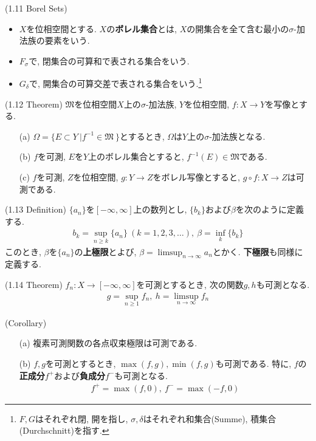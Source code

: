 \documentclass[a4paper]{jsarticle}
\begin{document}
\begin{defi}{(1.11 Borel Sets)}{}
    \begin{itemize}
        \item $X$を位相空間とする. $X$の{\bf ボレル集合}とは, $X$の開集合を全て含む最小の$\sigma$-加法族の要素をいう.
        \item $F_\sigma$で, 閉集合の可算和で表される集合をいう.
        \item $G_\delta$で, 開集合の可算交差で表される集合をいう.\footnote{$F, G$はそれぞれ閉, 開を指し, $\sigma, \delta$はそれぞれ和集合(Summe), 積集合(Durchschnitt)を指す.}
    \end{itemize}
\end{defi}

\begin{thm}{(1.12 Theorem)}{}
    $\mathfrak{M}$を位相空間$X$上の$\sigma$-加法族, $Y$を位相空間, $f:X\to Y$を写像とする.
    \begin{enumerate}
        \item[(a)] $\Omega = \{E\subset Y\ | f^{-1}\in \mathfrak{M} \  \}$とするとき, $\Omega$は$Y$上の$\sigma$-加法族となる.
        \item[(b)] $f$を可測, $E$を$Y$上のボレル集合とすると, $f^{-1}(E)\in \mathfrak{M}$である.
        \item[(c)] $f$を可測, $Z$を位相空間, $g:Y\to Z$をボレル写像とすると, $g\circ f:X\to Z$は可測である.
    \end{enumerate}
\end{thm}

\begin{defi}{(1.13 Definition)}{}
    $\{a_n\}$を$[-\infty, \infty]$上の数列とし, $\{b_k\}$および$\beta$を次のように定義する.
    \begin{align*}
        b_k = \sup_{n\geq k} \{a_n\} \ (k=1, 2, 3, \dots), \ \beta = \inf_k \{b_k\}
    \end{align*}
    このとき, $\beta$を$\{a_n\}$の{\bf 上極限}とよび, $\beta = \limsup_{n\to \infty} a_n$とかく. {\bf 下極限}も同様に定義する.
\end{defi}

\begin{thm}{(1.14 Theorem)}{}
    $f_n:X\to [-\infty, \infty]$を可測とするとき, 次の関数$g, h$も可測となる.
    \begin{align*}
        g = \sup_{n\geq 1} f_n, \ h = \limsup_{n\to \infty} f_n
    \end{align*}
\end{thm}
\begin{cor}{(Corollary)}{}
    \begin{enumerate}
        \item[(a)] 複素可測関数の各点収束極限は可測である.
        \item[(b)] $f, g$を可測とするとき, $\max (f, g), \min(f, g)$も可測である. 特に, $f$の{\bf 正成分}$f^+$および{\bf 負成分}$f^-$も可測となる.
        \begin{align*}
            f^+ = \max(f, 0), \ f^- = \max(-f, 0)
        \end{align*}
    \end{enumerate}
\end{cor}
\end{document}
